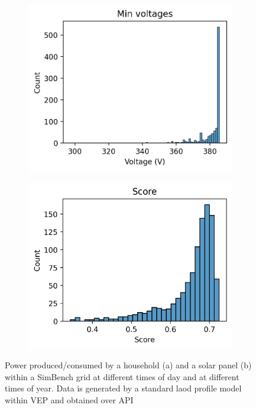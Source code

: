 \begin{figure}[H]
\begin{subfigure}{.33\textwidth}
        \caption{}
        \label{fig:result:suburban:histograms:line_loss_rel}
      \end{subfigure}\\
      \begin{subfigure}{.33\textwidth}
        \centering
        \includegraphics[width=\linewidth]{img/switchstate_exploring/swiss_suburb/histograms/min_voltage.png}
        \caption{}
        \label{fig:result:suburban:histograms:min_voltage}
      \end{subfigure}%
      \begin{subfigure}{.33\textwidth}
        \centering
        \includegraphics[width=\linewidth]{img/switchstate_exploring/swiss_suburb/histograms/score.png}
        \caption{}
        \label{fig:result:suburban:histograms:score}
      \end{subfigure}
    \caption{Power produced/consumed by a household (a) and a solar panel (b) within a SimBench grid at different times of day and at different times of year. Data is generated by a standard laod profile model within VEP and obtained over API\autocite{venios}}
    \label{fig:result:suburban:histograms}
\end{figure}